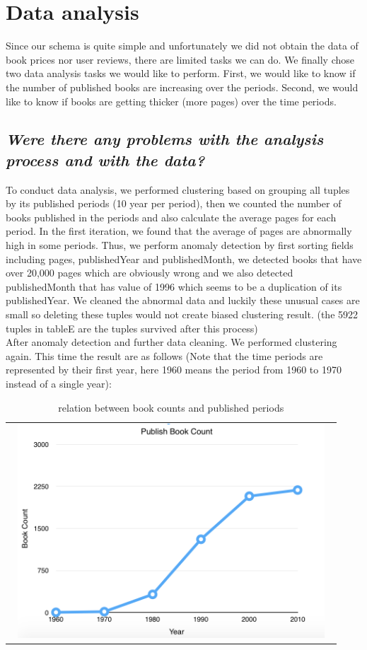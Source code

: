 \documentclass[10pt, oneside]{article}
\begin{document}
\section*{Data analysis}
Since our schema is quite simple and unfortunately we did not obtain the data of book prices nor user reviews, there are limited tasks we can do. We finally chose two data analysis tasks we would like to perform. First, we would like to know if the number of published books are increasing over the periods. Second, we would like to know if books are getting thicker (more pages) over the time periods.
\subsection*{\textit{Were there any problems with the analysis process and with the data?}}
To conduct data analysis, we performed clustering based on grouping all tuples by its published periods (10 year per period), then we counted the number of books published in the periods and also calculate the average pages for each period. In the first iteration, we found that the average of pages are abnormally high in some periods. Thus, we perform anomaly detection by first sorting fields including pages, publishedYear and publishedMonth, we detected books that have over 20,000 pages which are obviously wrong and we also detected publishedMonth that has value of 1996 which seems to be a duplication of its publishedYear. We cleaned the abnormal data and luckily these unusual cases are small so deleting these tuples would not create biased clustering result. (the 5922 tuples in tableE are the tuples survived after this process)\\
After anomaly detection and further data cleaning. We performed clustering again. This time the result are as follows (Note that the time periods are represented by their first year, here 1960 means the period from 1960 to 1970 instead of a single year):

\begin{table}[H]
\centering
\begin{tabular}{c}
\includegraphics[width=12cm, height=8cm]{bookcount}
\end{tabular}
\caption{relation between book counts and published periods}
\end{table}
\end{document}
